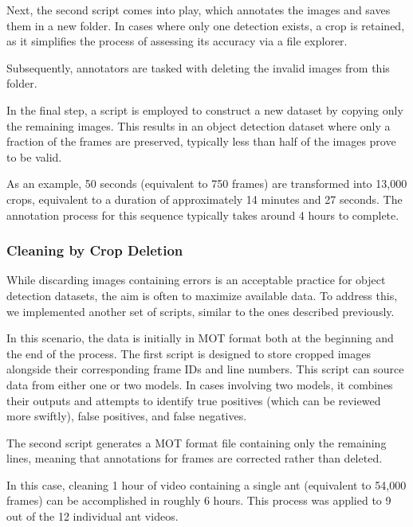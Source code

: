 {
    Next, the second script comes into play, which annotates the images and saves them in a new folder. 
    In cases where only one detection exists, a crop is retained, as it simplifies the process of assessing its accuracy via a file explorer. 
}

{
    Subsequently, annotators are tasked with deleting the invalid images from this folder.
}

{
    In the final step, a script is employed to construct a new dataset by copying only the remaining images. 
    This results in an object detection dataset where only a fraction of the frames are preserved, 
    typically less than half of the images prove to be valid.
}

{
    As an example, 50 seconds (equivalent to 750 frames) are transformed into 13,000 crops, 
    equivalent to a duration of approximately 14 minutes and 27 seconds. 
    The annotation process for this sequence typically takes around 4 hours to complete.
}

\subsubsection{Cleaning by Crop Deletion}

{
    While discarding images containing errors is an acceptable practice for object detection datasets, the aim is often to maximize available data. 
    To address this, we implemented another set of scripts, similar to the ones described previously.
}

{
    In this scenario, the data is initially in MOT format both at the beginning and the end of the process. 
    The first script is designed to store cropped images alongside their corresponding frame IDs and line numbers.  
    This script can source data from either one or two models. 
    In cases involving two models, it combines their outputs and attempts to identify true positives (which can be reviewed more swiftly), false positives, and false negatives.  
}

{
    The second script generates a MOT format file containing only the remaining lines, meaning that annotations for frames are corrected rather than deleted.
}

{
    In this case, cleaning 1 hour of video containing a single ant (equivalent to 54,000 frames) can be accomplished in roughly 6 hours. 
    This process was applied to 9 out of the 12 individual ant videos.
}

\needspace{0.2\textheight}

